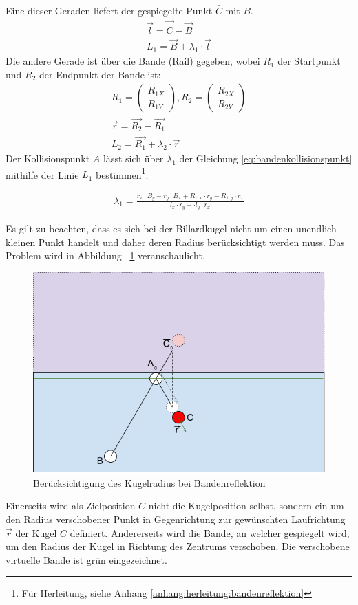 Eine dieser Geraden liefert der gespiegelte Punkt $\bar{C}$ mit $B$.
\begin{align}
    \vec{l} = \vec{\bar{C}} - \vec{B}\\
    L_1 = \vec{B} + \lambda_1 \cdot \vec{l}
\end{align}
Die andere Gerade ist über die Bande (Rail) gegeben, wobei $R_1$ der Startpunkt und $R_2$ der Endpunkt der Bande ist:
\begin{align}
    R_1 = \begin{pmatrix}R_{1X}\\R_{1Y}\end{pmatrix}, R_2 = \begin{pmatrix}R_{2X}\\R_{2Y}\end{pmatrix}\\
    \vec{r} = \vec{R_2} - \vec{R_1}\\
    L_2 = \vec{R_1} + \lambda_2 \cdot \vec{r}
\end{align}
Der Kollisionspunkt $A$ lässt sich über $\lambda_1$ der Gleichung \ref{eq:bandenkollisionspunkt} mithilfe der Linie $L_1$
bestimmen\footnote{Für Herleitung, siehe Anhang \ref{anhang:herleitung:bandenreflektion}}.

\begin{align}
    \lambda_1 = \frac{r_x \cdot B_y - r_y \cdot B_x + R_{1,x} \cdot r_y - R_{1,y} \cdot r_x}{l_x \cdot r_y - \cdot l_y \cdot r_x}\label{eq:bandenkollisionspunkt}
\end{align}

Es gilt zu beachten, dass es sich bei der Billardkugel nicht um einen unendlich kleinen Punkt handelt und
daher deren Radius berücksichtigt werden muss.
Das Problem wird in Abbildung ~\ref{fig:bandenreflektion_kugelradius} veranschaulicht.
\begin{figure}[h!]
    \begin{center}
        \includegraphics[width=0.5\linewidth]{../common/03_billiard_ai/resources/48_bandenreflektion_kugelradius.png}
    \end{center}
    \caption{Berücksichtigung des Kugelradius bei Bandenreflektion}
    \label{fig:bandenreflektion_kugelradius}
\end{figure}
Einerseits wird als Zielposition $C$ nicht die Kugelposition selbst, sondern ein um den Radius verschobener Punkt in
Gegenrichtung zur gewünschten Laufrichtung $\vec{r}$ der Kugel $C$ definiert. Andererseits wird die Bande, an welcher
gespiegelt wird, um den Radius der Kugel in Richtung des Zentrums verschoben. Die verschobene virtuelle Bande ist grün eingezeichnet.

